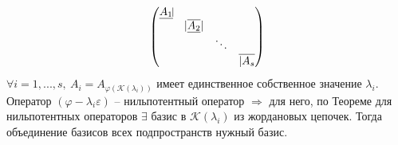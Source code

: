 \documentclass[a4paper, 12pt]{article}
\theoremstyle{definition}
\begin{document}
    $$\begin{pmatrix}
        \underline{A_1\vline} & \null & \null & \null\\
        \null  & |\overline{\underline{A_2}}| & \null & \null\\
        \null & \null & \ddots & \null\\
        \null & \null & \null & \overline{|A_s} 
    \end{pmatrix}$$
    $\forall i = 1,...,s,\ A_i = A_{\varphi(\mathcal{K}
    (\lambda_i))}$ имеет единственное собственное значение 
    $\lambda_i.$\\ Оператор $(\varphi - \lambda_i \varepsilon)$
    -- нильпотентный оператор $\Longrightarrow $ для него,
    по Теореме для нильпотентных операторов $\exists$ базис
    в $\mathcal{K}(\lambda_i)$  из жордановых цепочек.
    Тогда объединение базисов всех подпространств нужный базис.
\end{document}
